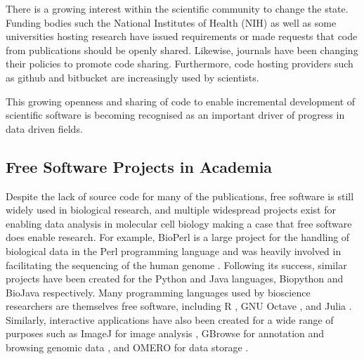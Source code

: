   There is a growing
  interest within the scientific community to change the state.  Funding
  bodies such the National Institutes of Health (NIH)
  as well as some universities hosting research have issued
  requirements or made requests
  that code from publications should be openly shared.
  Likewise, journals have been
  changing their policies to promote code sharing.
  Furthermore, code hosting
  providers such as github and bitbucket
  are increasingly used by scientists.

  This growing openness and sharing of code to enable incremental
  development of scientific software is becoming recognised as an
  important driver of progress in data driven fields.

  \subsection{Free Software Projects in Academia}
  Despite the lack of source code for many of the publications,
  free software is still widely used in biological research,
  and multiple widespread projects exist
  for enabling data analysis in molecular cell biology
  making a case that free software does enable research.
  For example, BioPerl is a large project for the handling of biological
  data in the Perl programming language and was heavily involved in
  facilitating the sequencing of the human genome \citep{bioperl}.
  Following its success, similar projects have been
  created for the Python and Java languages,
  Biopython \citep{biopython} and BioJava \citep{biojava}
  respectively.
  Many programming languages used by bioscience researchers are themselves
  free software, including R \citep{R-manual}, GNU
  Octave \citep{octave}, and Julia \citep{julia}.
  Similarly, interactive applications have also been
  created for a wide range of purposes such as
  ImageJ for image analysis \citep{imagej1}, GBrowse for
  annotation and browsing genomic data \citep{gbrowse},
  and OMERO for data storage \citep{omero}.


